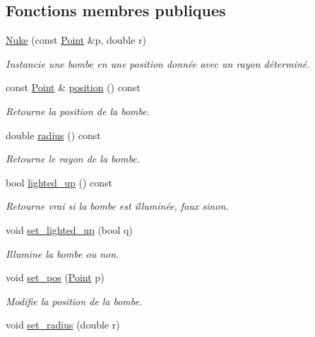 \subsection*{Fonctions membres publiques}
\begin{DoxyCompactItemize}
\item 
\hyperlink{classNuke_aaa149002891655e65eb870a681d1e94b}{Nuke} (const \hyperlink{classPoint}{Point} \&p, double r)
\begin{DoxyCompactList}\small\item\em Instancie une bombe en une position donnée avec un rayon déterminé. \end{DoxyCompactList}\item 
const \hyperlink{classPoint}{Point} \& \hyperlink{classNuke_a34bb8174851ffa14d5d0f9d891d59dbb}{position} () const 
\begin{DoxyCompactList}\small\item\em Retourne la position de la bombe. \end{DoxyCompactList}\item 
double \hyperlink{classNuke_af3ca35e705178487be9005d5586892b2}{radius} () const 
\begin{DoxyCompactList}\small\item\em Retourne le rayon de la bombe. \end{DoxyCompactList}\item 
bool \hyperlink{classNuke_a27bece8a254df670b90755f42a8d9bb4}{lighted\+\_\+up} () const 
\begin{DoxyCompactList}\small\item\em Retourne vrai si la bombe est illuminée, faux sinon. \end{DoxyCompactList}\item 
void \hyperlink{classNuke_a06abcff72700c24168c5779ed8b2cede}{set\+\_\+lighted\+\_\+up} (bool q)
\begin{DoxyCompactList}\small\item\em Illumine la bombe ou non. \end{DoxyCompactList}\item 
void \hyperlink{classNuke_acc486ad0d5b1f348ee1146291c2ed72e}{set\+\_\+pos} (\hyperlink{classPoint}{Point} p)
\begin{DoxyCompactList}\small\item\em Modifie la position de la bombe. \end{DoxyCompactList}\item 
void \hyperlink{classNuke_a5dbc3fbb7327fefced855e7accbf71b9}{set\+\_\+radius} (double r)

\end{DoxyCompactItemize}

